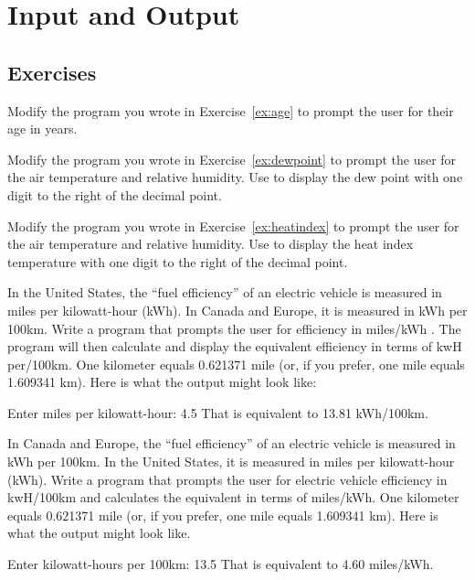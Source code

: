 \chapter{Input and Output}

\section{Exercises}

\begin{exercise}
Modify the program you wrote in Exercise~\ref{ex:age} to prompt the user for their age in years.
\end{exercise}

\begin{exercise}
\label{ex:dewpoint2}
Modify the program you wrote in Exercise~\ref{ex:dewpoint} to prompt the user for the air temperature and relative humidity. Use  to display the dew point with one digit to the right of the decimal point.
\end{exercise}

\begin{exercise}
Modify the program you wrote in Exercise~\ref{ex:heatindex} to prompt the user for the air temperature and relative humidity. Use  to display the heat index temperature with one digit to the right of the decimal point.
\end{exercise}

\begin{exercise}
\label{ex:electricvehicle1}
In the United States, the ``fuel efficiency'' of an electric vehicle is measured in miles per kilowatt-hour (kWh). In Canada and Europe, it is measured in kWh per 100km. Write a program that prompts the user for efficiency in miles/kWh . The program will then calculate and display the equivalent efficiency in terms of kwH per/100km. One kilometer equals 0.621371 mile (or, if you prefer, one mile equals 1.609341 km). Here is what the output might look like:

\begin{stdout}
Enter miles per kilowatt-hour: 4.5
That is equivalent to 13.81 kWh/100km.
\end{stdout}

\end{exercise}

\begin{exercise}
\label{ex:electricvehicle2}
In Canada and Europe, the ``fuel efficiency'' of an electric vehicle is measured in kWh per 100km. In the United States, it is measured in miles per kilowatt-hour (kWh).  Write a program that prompts the user for electric vehicle efficiency in kwH/100km and calculates the equivalent in terms of miles/kWh.  One kilometer equals 0.621371 mile (or, if you prefer, one mile equals 1.609341 km). Here is what the output might look like.

\begin{stdout}
Enter kilowatt-hours per 100km: 13.5
That is equivalent to 4.60 miles/kWh.
\end{stdout}
\end{exercise}


